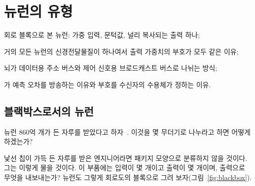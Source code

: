 \chapter{뉴런의 유형}
\label{sec:neurontypes}
\begin{chaptergoals}
\item 회로 블록으로 본 뉴런: 가중 입력, 문턱값, 널리 복사되는 출력 하나;
\item 거의 모든 뉴런의 신경전달물질이 하나여서 출력 가중치의 부호가 모두 같은 이유;
\item 뇌가 데이터용 주소 버스와 제어 신호용 브로드캐스트 버스로 나뉘는 방식;
\item {}가 예측 오차를 방송하는 이유와 부호를 수신자의 수용체가 정하는 이유.
\end{chaptergoals}

\section{블랙박스로서의 뉴런}

뉴런 860억 개가 든 자루를 받았다고 하자~\cite{Azevedo2009}. 이것을 몇 무더기로 나누라고 하면 어떻게 하겠는가?

낯선 칩이 가득 든 자루를 받은 엔지니어라면 패키지 모양으로 분류하지 않을 것이다. 그는 이렇게 물을 것이다. 이 부품에는 입력이 몇 개이고 출력이 몇 개이며, 출력으로 무엇을 내보내는가? 뉴런도 그렇게 회로도의 블록으로 그려 보자(그림~\ref{fig:blackbox}).

